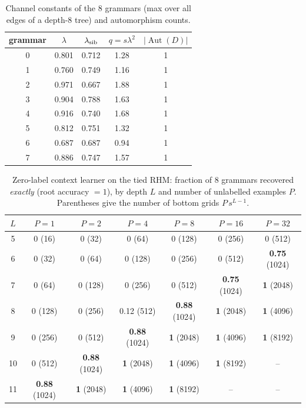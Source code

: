 \documentclass[11pt]{article}
\theoremstyle{definition}
\newcommand{\Aut}{\operatorname{Aut}}
\begin{document}
\begin{table}[h]\centering
\caption{Channel constants of the 8 grammars (max over all edges of a depth-8 tree) and
automorphism counts.}\label{tab:consts}
\small\begin{tabular}{ccccc}\toprule grammar & $\lambda$ & $\lambda_{\rm sib}$ & $q=s\lambda^2$ & $|\Aut(D)|$\\ \midrule
0 & 0.801 & 0.712 & 1.28 & 1\\
1 & 0.760 & 0.749 & 1.16 & 1\\
2 & 0.971 & 0.667 & 1.88 & 1\\
3 & 0.904 & 0.788 & 1.63 & 1\\
4 & 0.916 & 0.740 & 1.68 & 1\\
5 & 0.812 & 0.751 & 1.32 & 1\\
6 & 0.687 & 0.687 & 0.94 & 1\\
7 & 0.886 & 0.747 & 1.57 & 1\\
\bottomrule\end{tabular}
\end{table}

\begin{table}[h]\centering
\caption{Zero-label context learner on the tied RHM: fraction of 8 grammars recovered
\emph{exactly} (root accuracy $=1$), by depth $L$ and number of unlabelled examples $P$.
Parentheses give the number of bottom grids $P\,s^{L-1}$.}\label{tab:ctx}
\small\begin{tabular}{ccccccc}\toprule
$L$ & $P=1$ & $P=2$ & $P=4$ & $P=8$ & $P=16$ & $P=32$\\ \midrule
5 & 0 (16) & 0 (32) & 0 (64) & 0 (128) & 0 (256) & 0 (512)\\
6 & 0 (32) & 0 (64) & 0 (128) & 0 (256) & 0 (512) & \textbf{0.75} (1024)\\
7 & 0 (64) & 0 (128) & 0 (256) & 0 (512) & \textbf{0.75} (1024) & \textbf{1} (2048)\\
8 & 0 (128) & 0 (256) & 0.12 (512) & \textbf{0.88} (1024) & \textbf{1} (2048) & \textbf{1} (4096)\\
9 & 0 (256) & 0 (512) & \textbf{0.88} (1024) & \textbf{1} (2048) & \textbf{1} (4096) & \textbf{1} (8192)\\
10 & 0 (512) & \textbf{0.88} (1024) & \textbf{1} (2048) & \textbf{1} (4096) & \textbf{1} (8192) & --\\
11 & \textbf{0.88} (1024) & \textbf{1} (2048) & \textbf{1} (4096) & \textbf{1} (8192) & -- & --\\
\bottomrule\end{tabular}
\end{table}
\end{document}

